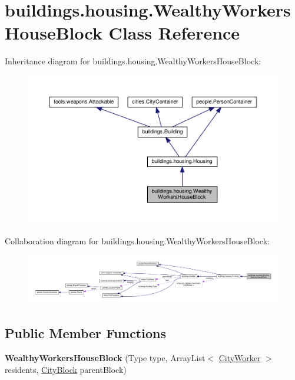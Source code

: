 \hypertarget{classbuildings_1_1housing_1_1_wealthy_workers_house_block}{}\section{buildings.\+housing.\+Wealthy\+Workers\+House\+Block Class Reference}
\label{classbuildings_1_1housing_1_1_wealthy_workers_house_block}


Inheritance diagram for buildings.\+housing.\+Wealthy\+Workers\+House\+Block\+:\nopagebreak
\begin{figure}[H]
\begin{center}
\leavevmode
\includegraphics[width=350pt]{classbuildings_1_1housing_1_1_wealthy_workers_house_block__inherit__graph}
\end{center}
\end{figure}


Collaboration diagram for buildings.\+housing.\+Wealthy\+Workers\+House\+Block\+:\nopagebreak
\begin{figure}[H]
\begin{center}
\leavevmode
\includegraphics[width=350pt]{classbuildings_1_1housing_1_1_wealthy_workers_house_block__coll__graph}
\end{center}
\end{figure}
\subsection*{Public Member Functions}
\begin{DoxyCompactItemize}
\item 
{\bfseries Wealthy\+Workers\+House\+Block} (Type type, Array\+List$<$ \hyperlink{classpeople_1_1cityworkers_1_1_city_worker}{City\+Worker} $>$ residents, \hyperlink{classcities_1_1_city_block}{City\+Block} parent\+Block)\hypertarget{classbuildings_1_1housing_1_1_wealthy_workers_house_block_af3a4397c42ffef7207e2f4ad2671a4bf}{}\label{classbuildings_1_1housing_1_1_wealthy_workers_house_block_af3a4397c42ffef7207e2f4ad2671a4bf}

\end{DoxyCompactItemize}
